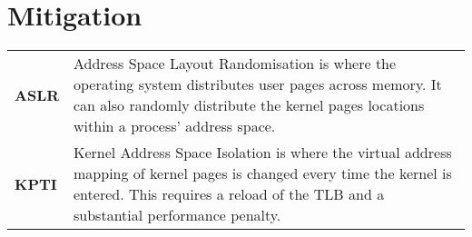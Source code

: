 \section{Mitigation}
\begin{center}
	\begin{tabular}{p{} p{}}
		\textbf{ASLR} & Address Space Layout Randomisation is where the operating system distributes user pages across memory. It can also randomly distribute the kernel pages locations within a process' address space.        \\
		\textbf{KPTI} & Kernel Address Space Isolation is where the virtual address mapping of kernel pages is changed every time the kernel is entered. This requires a reload of the TLB and a substantial performance penalty. \\
	\end{tabular}
\end{center}

